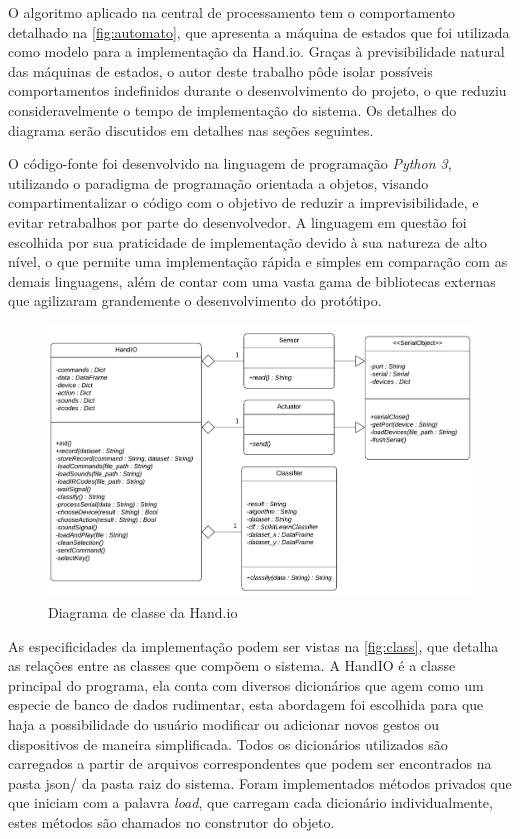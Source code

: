 O algoritmo aplicado na central de processamento tem o comportamento detalhado na \autoref{fig:automato}, que apresenta a máquina de estados que foi utilizada como modelo para a implementação da Hand.io. Graças à previsibilidade natural das máquinas de estados, o autor deste trabalho pôde isolar possíveis comportamentos indefinidos durante o desenvolvimento do projeto, o que reduziu consideravelmente o tempo de implementação do sistema. Os detalhes do diagrama serão discutidos em detalhes nas seções seguintes.

O código-fonte foi desenvolvido na linguagem de programação \textit{Python 3}, utilizando o paradigma de programação orientada a objetos, visando compartimentalizar o código com o objetivo de reduzir a imprevisibilidade, e evitar retrabalhos por parte do desenvolvedor. A linguagem em questão foi escolhida por sua praticidade de implementação devido à sua natureza de alto nível, o que permite uma implementação rápida e simples em comparação com as demais linguagens, além de contar com uma vasta gama de bibliotecas externas que agilizaram grandemente o desenvolvimento do protótipo.

\begin{figure}[ht]
    \centering
    \includegraphics[width=\textwidth, keepaspectratio]{resources/diagrama_classe.pdf}
    \caption{Diagrama de classe da Hand.io}
    \label{fig:class}
\end{figure}

As especificidades da implementação podem ser vistas na \autoref{fig:class}, que detalha as relações entre as classes que compõem o sistema. A HandIO é a classe principal do programa, ela conta com diversos dicionários que agem como um especie de banco de dados rudimentar, esta abordagem foi escolhida para que haja a possibilidade do usuário modificar ou adicionar novos gestos ou dispositivos de maneira simplificada. Todos os dicionários utilizados são carregados a partir de arquivos correspondentes que podem ser encontrados na pasta json/ da pasta raiz do sistema. Foram implementados métodos privados que que iniciam com a palavra \textit{load}, que carregam cada dicionário individualmente, estes métodos são chamados no construtor do objeto.






